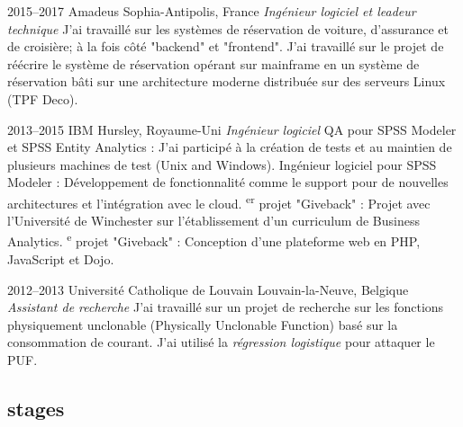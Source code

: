 \documentclass[]{friggeri-cv} %
\begin{document}
\begin{entrylist}


\entry
{2015--2017}
{Amadeus}
{Sophia-Antipolis, France}
{\emph{Ingénieur logiciel et leadeur technique}
\medbreak
J’ai travaillé sur les systèmes de réservation de voiture, d'assurance et de croisière; à la
fois côté "backend" et "frontend".
\smallbreak
J’ai travaillé sur le projet de réécrire le système de
    réservation opérant sur mainframe en un système de réservation bâti sur une
    architecture moderne distribuée sur des serveurs Linux (TPF Deco).
\bigbreak %
}

\entry
{2013--2015}
{IBM}
{Hursley, Royaume-Uni}
{\emph{Ingénieur logiciel}
\medbreak
QA pour SPSS Modeler et SPSS Entity Analytics : J’ai participé à la création de
    tests et au maintien de plusieurs machines de test (Unix and Windows).
\smallbreak
Ingénieur logiciel pour SPSS Modeler : Développement de fonctionnalité comme le
    support pour de nouvelles architectures et l’intégration avec le cloud.
\textsuperscript{er} projet "Giveback" : Projet avec l’Université de Winchester sur
    l’établissement d’un curriculum de Business Analytics.
\textsuperscript{e} projet "Giveback" : Conception d’une plateforme web en PHP, JavaScript et
    Dojo.
\bigbreak %
}

\entry
{2012--2013}
{Université Catholique de Louvain}
{Louvain-la-Neuve, Belgique}
{\emph{Assistant de recherche}
\medbreak
J’ai travaillé sur un projet de recherche sur les fonctions physiquement
unclonable
(Physically Unclonable Function) basé sur la consommation de courant. J’ai utilisé la
\emph{régression logistique} pour attaquer le PUF.
}

\end{entrylist}

\newpage

\subsection{stages}
\end{document}
